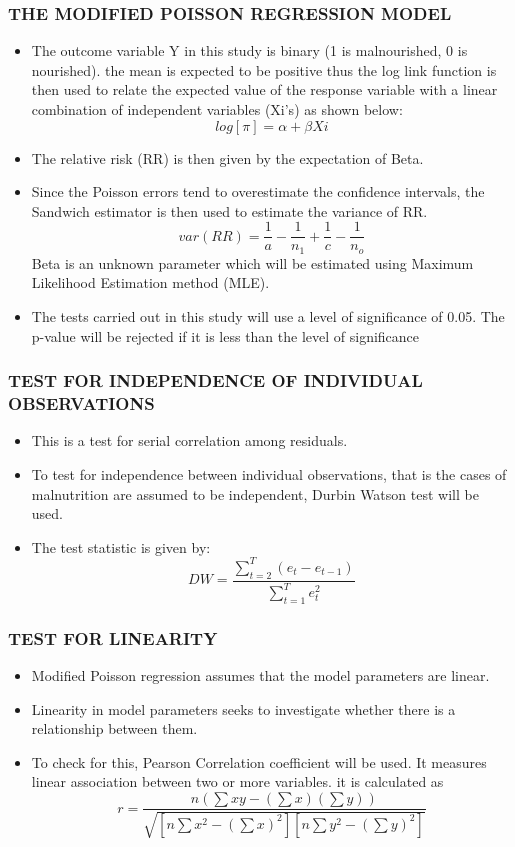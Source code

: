 \begin{frame}
\frametitle{THE MODIFIED POISSON REGRESSION MODEL}
\begin{itemize}
	\item The outcome variable Y in this study is binary (1 is malnourished, 0 is    nourished). the mean is expected to be positive thus the log link function is then used to relate the expected value of the response variable with a linear combination of independent variables (Xi’s) as shown below: 	 
	\[ log[\pi] = \alpha + \beta Xi\]
	\item The relative risk (RR) is then given by the expectation of Beta. 
	\item Since the Poisson errors tend to overestimate the confidence intervals, the Sandwich estimator is then used to estimate the variance of RR. 
	\[ var(RR) = \frac {1}{a} -\frac {1}{n_{1}} + \frac {1}{c} -\frac{1}{n_{o}}\]
	Beta is an unknown parameter which will be estimated using Maximum Likelihood Estimation method (MLE). 
	 \item The tests carried out in this study will use a level of significance of 0.05. The p-value will be rejected if it is less than the level of significance
\end{itemize}
\end{frame}
\begin{frame}
\frametitle{TEST FOR INDEPENDENCE OF INDIVIDUAL OBSERVATIONS}
\begin{itemize}
	\item This is a test for serial correlation among residuals. 
	\item To test for independence between individual observations, that is the cases of malnutrition are assumed to be independent, Durbin Watson test will be used. 
	\item The test statistic is given by: 
	\[ DW =\frac{\sum _{t=2}^{T} (e_{t}-e_{t-1})}{\sum_{t=1}^{T}e_{t}^{2}} \]
\end{itemize}
\end{frame}
\begin{frame}
\frametitle{TEST FOR LINEARITY}
\begin{itemize}
	\item Modified Poisson regression assumes that the model parameters are linear.
	\item Linearity in model parameters seeks to investigate whether there is a relationship between them. 
	\item To check for this, Pearson Correlation coefficient will be used.  It measures linear association between two or more variables. it is calculated as
		\[ r=\frac{n (\sum xy -(\sum x)(\sum y))} {\sqrt { [n \sum x ^ 2 - (\sum x)^2][n \sum y^2 - (\sum y)^2]}}\] 	
\end{itemize}
\end{frame}
